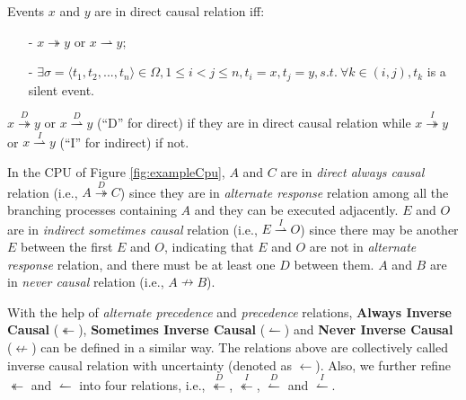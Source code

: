 \documentclass{llncs}
\begin{document}
\begin{definition}\label{def:sda}
Events $x$ and $y$ are in direct causal relation iff:
	\begin{itemize}
		\item[-] $x\twoheadrightarrow y$ or $x\rightharpoonup y$;
		\item[-] $\exists\sigma=\langle t_{1},t_{2},...,t_{n}\rangle\in\Omega,1\leq i<j\leq n,t_{i}=x,t_{j}=y,s.t.~\forall k\in(i,j),t_{k}$ is a silent event.
	\end{itemize}
	$x\overset{D}{\twoheadrightarrow}y$ or $x\overset{D}{\rightharpoonup}y$ (``D'' for direct) if they are in direct causal relation while $x\overset{I}{\twoheadrightarrow}y$ or $x\overset{I}{\rightharpoonup}y$ (``I'' for indirect) if not.
\end{definition}

\begin{example}\label{ex:causalRelation}
In the CPU of Figure \ref{fig:exampleCpu}, $A$ and $C$ are in \textit{direct always causal} relation (i.e., $A\overset{D}{\twoheadrightarrow}C$) since they are in \textit{alternate response} relation among all the branching processes containing $A$ and they can be executed adjacently. $E$ and $O$ are in \textit{indirect sometimes causal} relation (i.e., $E\overset{I}{\rightharpoonup}O$) since there may be another $E$ between the first $E$ and $O$, indicating that $E$ and $O$ are not in \textit{alternate response} relation, and there must be at least one $D$ between them. $A$ and $B$ are in \textit{never causal} relation (i.e., $A\nrightarrow B$).
\end{example}

With the help of \textit{alternate precedence} and \textit{precedence} relations, \textbf{Always Inverse Causal} ($\twoheadleftarrow$), \textbf{Sometimes Inverse Causal} ($\leftharpoonup$) and \textbf{Never Inverse Causal} ($\nleftarrow$) can be defined in a similar way. The relations above are collectively called inverse causal relation with uncertainty (denoted as $\leftarrow$). Also, we further refine $\twoheadleftarrow$ and $\leftharpoonup$ into four relations, i.e., $\overset{D}{\twoheadleftarrow}$, $\overset{I}{\twoheadleftarrow}$, $\overset{D}{\leftharpoonup}$ and $\overset{I}{\leftharpoonup}$.

\end{document}
